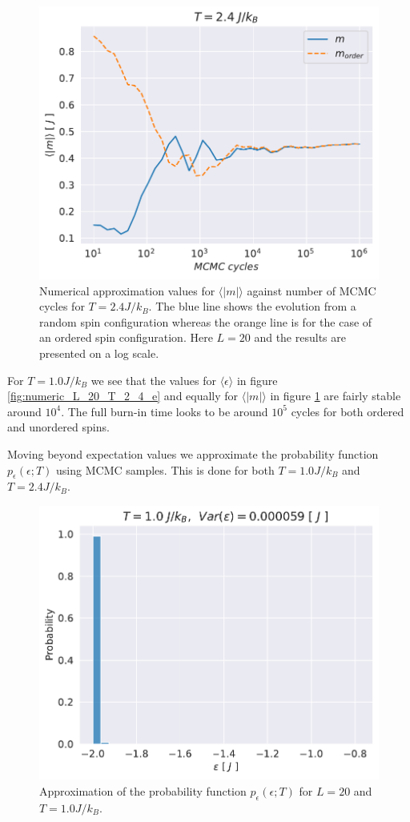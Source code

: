 \documentclass[english,notitlepage,reprint,nofootinbib]{revtex4-1}  %
\begin{document}
\begin{figure}[H]
    \centering
    \includegraphics[width=.5\textwidth]{../figures/numeric_L_20_T_2_4_m.pdf}
    \caption{Numerical approximation values for $\langle |m| \rangle$ against number of MCMC cycles for $T=2.4 J/k_B$. The blue line shows the evolution from a random spin configuration whereas the orange line is for the case of an ordered spin configuration. Here $L=20$ and the results are presented on a log scale.}
    \label{fig:numeric_L_20_T_2_4_m}
\end{figure}
For $T=1.0J/k_B$ we see that the values for $\langle \epsilon \rangle$ in figure \ref{fig:numeric_L_20_T_2_4_e} and equally for $\langle |m| \rangle$ in figure \ref{fig:numeric_L_20_T_2_4_m} are fairly stable around $10^4$. The full burn-in time looks to be around $10^5$ cycles for both ordered and unordered spins.

Moving beyond expectation values we approximate the probability function $p_{\epsilon}(\epsilon ; T)$ using MCMC samples. This is done for both $T=1.0J/k_B$ and $T=2.4J/k_B$.
\begin{figure}[H]
    \centering
    \includegraphics[width=.5\textwidth]{../figures/histogram_T_1_m.pdf}
    \caption{Approximation of the probability function $p_{\epsilon}(\epsilon ; T)$ for $L=20$ and $T=1.0 J/k_B$.}
    \label{fig:histogram_T_1_m}
\end{figure}
\end{document}
